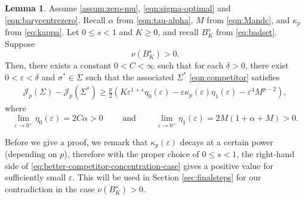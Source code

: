 \documentclass[preprint, reqno]{amsart}
\renewcommand{\epsilon}{\varepsilon}
\theoremstyle{definition}
\newtheorem{lemma}[definition]{Lemma}
\numberwithin{equation}{section}
\begin{document}
\begin{lemma}\label{badsetbig}
  Assume \eqref{assum:zero-mu}, \eqref{eqn:sigma-optimal} and
  \eqref{eqn:barycentrezero}. Recall $\alpha$ from
  \eqref{eqn:tau-alpha}, $M$ from \eqref{eqn:Mandc}, and $\kappa_p$
  from \eqref{eq:kappa}. Let $0 \leq s < 1$ and $K \geq 0$, and recall
  $B_K^s$ from \eqref{eq:badset}. Suppose $$\nu(B_K^s) > 0.$$ Then,
  there exists a constant $0 < C< \infty$ such that
  for each $\delta>0$, there exist $0< \epsilon<\delta$ and $\sigma^*
  \in \Sigma$ such that the associated $\Sigma^*$
  \eqref{eqn:competitor} satisfies
  \begin{align}\label{eq:better-competitor-concentration-case}
    \mathscr{J}_p(\Sigma) - \mathscr{J}_p(\Sigma^*) \geq
    \frac{p}{2} \left( K\epsilon^{1 + s}\eta_0(\epsilon) -
    \epsilon\kappa_p(\epsilon) \eta_1(\epsilon) -  \epsilon^4 M^{p-2}
    \right),
  \end{align}
  where
  \[
    \lim_{\epsilon \to 0^+} \eta_0(\epsilon) = 2C\alpha > 0
    \qquad \text{ and } \qquad
    \lim_{\varepsilon \to 0^+} \eta_1(\epsilon) = 2M(1 + \alpha + M) >
    0.
  \]
\end{lemma}
Before we give a proof, we remark that $\kappa_p (\epsilon)$ decays at
a certain power (depending on $p$), therefore with the proper choice
of $0 \leq s < 1$, the right-hand side of
\eqref{eq:better-competitor-concentration-case} gives a positive value
for sufficiently small $\epsilon$. This will be used in Section
\ref{sec:finalsteps} for our contradiction in the case $\nu(B_K^s) >
0$.
\end{document}
